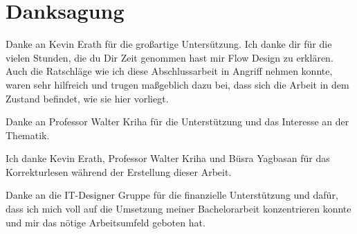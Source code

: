 \chapter*{Danksagung}

Danke an Kevin Erath für die großartige Untersützung.
Ich danke dir für die vielen Stunden, die du Dir Zeit genommen hast mir Flow
Design zu erklären.
Auch die Ratschläge wie ich diese Abschlussarbeit in Angriff nehmen konnte, waren sehr
hilfreich und trugen maßgeblich dazu bei, dass sich die Arbeit in dem Zustand 
befindet, wie sie hier vorliegt.

Danke an Professor Walter Kriha für die Unterstützung und das Interesse an der Thematik.

Ich danke Kevin Erath, Professor Walter Kriha und Büsra Yagbasan für das Korrekturlesen
während der Erstellung dieser Arbeit.

Danke an die IT-Designer Gruppe für die finanzielle Unterstützung
und dafür, dass ich mich voll auf die Umsetzung meiner Bachelorarbeit konzentrieren konnte
und mir das nötige Arbeitsumfeld geboten hat.






